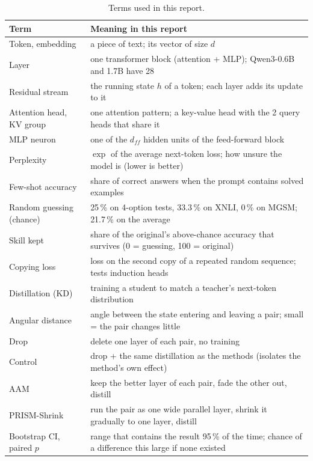 \documentclass[11pt]{article}
\begin{document}
\begin{table}[t]
\centering\small
\begin{tabular}{p{}p{}}
\toprule
Term & Meaning in this report \\
\midrule
Token, embedding & a piece of text; its vector of size $d$ \\
Layer & one transformer block (attention + MLP); Qwen3-0.6B and 1.7B have 28 \\
Residual stream & the running state $h$ of a token; each layer adds its update to it \\
Attention head, KV group & one attention pattern; a key-value head with the 2 query heads that share it \\
MLP neuron & one of the $d_{ff}$ hidden units of the feed-forward block \\
Perplexity & $\exp$ of the average next-token loss; how unsure the model is (lower is better) \\
Few-shot accuracy & share of correct answers when the prompt contains solved examples \\
Random guessing (chance) & 25\,\% on 4-option tests, 33.3\,\% on XNLI, 0\,\% on MGSM; 21.7\,\% on the average \\
Skill kept & share of the original's above-chance accuracy that survives (0 = guessing, 100 = original) \\
Copying loss & loss on the second copy of a repeated random sequence; tests induction heads \\
Distillation (KD) & training a student to match a teacher's next-token distribution \\
Angular distance & angle between the state entering and leaving a pair; small = the pair changes little \\
Drop & delete one layer of each pair, no training \\
Control & drop + the same distillation as the methods (isolates the method's own effect) \\
AAM & keep the better layer of each pair, fade the other out, distill \\
PRISM-Shrink & run the pair as one wide parallel layer, shrink it gradually to one layer, distill \\
Bootstrap CI, paired $p$ & range that contains the result 95\,\% of the time; chance of a difference this large if none existed \\
\bottomrule
\end{tabular}
\caption{Terms used in this report.}
\label{tab:glossary}
\end{table}
\end{document}
